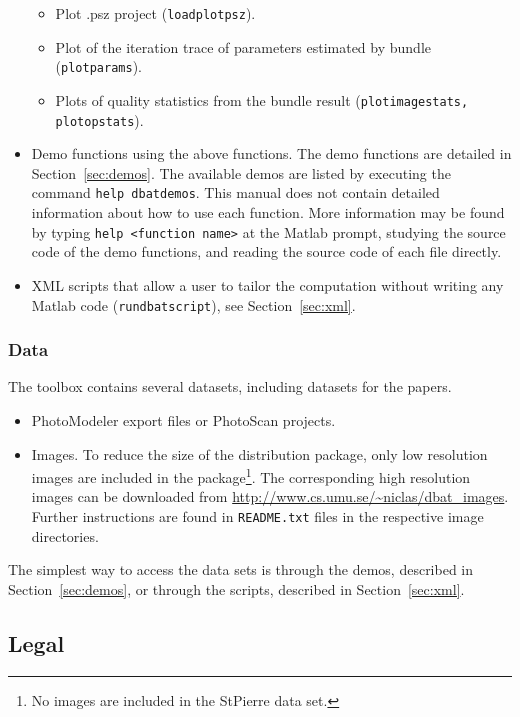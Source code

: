 \documentclass{article}
\begin{document}
\begin{itemize}
\begin{itemize}
  \item Plot .psz project (\texttt{loadplotpsz}).
  \item Plot of the iteration trace of parameters estimated by bundle
    (\texttt{plotparams}).
  \item Plots of quality statistics from the bundle result
    (\texttt{plotimagestats, plotopstats}).
  \end{itemize}
\item Demo functions using the above functions. The demo functions are
  detailed in Section~\ref{sec:demos}. The available demos are listed
  by executing the command \texttt{help dbatdemos}. This manual does
  not contain detailed information about how to use each function.
  More information may be found by typing \texttt{help <function
    name>} at the Matlab prompt, studying the source code of the demo
  functions, and reading the source code of each file directly.
\item XML scripts that allow a user to tailor the computation without
  writing any Matlab code (\texttt{rundbatscript}), see
  Section~\ref{sec:xml}.
\end{itemize}

\subsubsection{Data}

The toolbox contains several datasets, including datasets for the
\citet{Borlin2016:External,Murtiyoso2017:Reprocessing} papers.
\begin{itemize}
\item PhotoModeler export files or PhotoScan projects.
\item Images. To reduce the size of the distribution package, only low
  resolution images are included in the package\footnote{No images are
    included in the StPierre data set.}. The corresponding high
  resolution images can be downloaded from
  \url{http://www.cs.umu.se/~niclas/dbat_images}. Further instructions
  are found in \texttt{README.txt} files in the respective image
  directories.
\end{itemize}
The simplest way to access the data sets is through the demos,
described in Section~\ref{sec:demos}, or through the scripts,
described in Section~\ref{sec:xml}.

\subsection{Legal}
\end{document}
